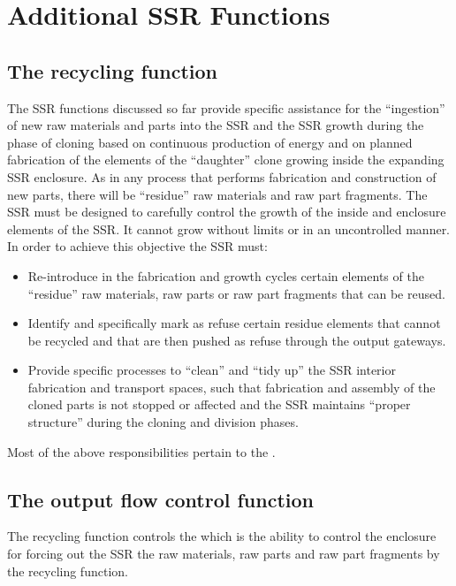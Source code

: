 \section{Additional SSR Functions}

\subsection[The recycling function]{The recycling function}

The SSR functions discussed so
far provide specific assistance for the “ingestion” of new raw
materials and parts into the SSR and the SSR growth during the phase of
cloning based on continuous production of energy and on planned
fabrication of the elements of the “daughter” clone growing inside the
expanding SSR enclosure. As in any process that performs fabrication
and construction of new parts, there will be “residue” raw materials
and raw part fragments.  The SSR must be designed to carefully control
the growth of the inside and enclosure elements of the SSR. It cannot
grow without limits or in an uncontrolled manner. In order to achieve
this objective the SSR must:

\begin{itemize}
\item Re-introduce in the fabrication and growth cycles certain elements
of the “residue” raw materials, raw parts or raw part fragments that
can be reused.
\item Identify and specifically mark as refuse certain residue elements
that cannot be recycled and that are then pushed as refuse through the
output gateways.
\item Provide specific processes to “clean” and “tidy up” the SSR
interior fabrication and transport spaces, such that fabrication and
assembly of the cloned parts is not stopped or affected and the SSR
maintains “proper structure” during the cloning and division phases.
\end{itemize}

Most of the above responsibilities pertain to the .

\subsection[The output flow control function]{The output flow control
function}

The recycling function controls
the  which is the ability to
control the enclosure  for forcing out the SSR
the raw materials, raw parts and raw part fragments  
by the recycling function.

